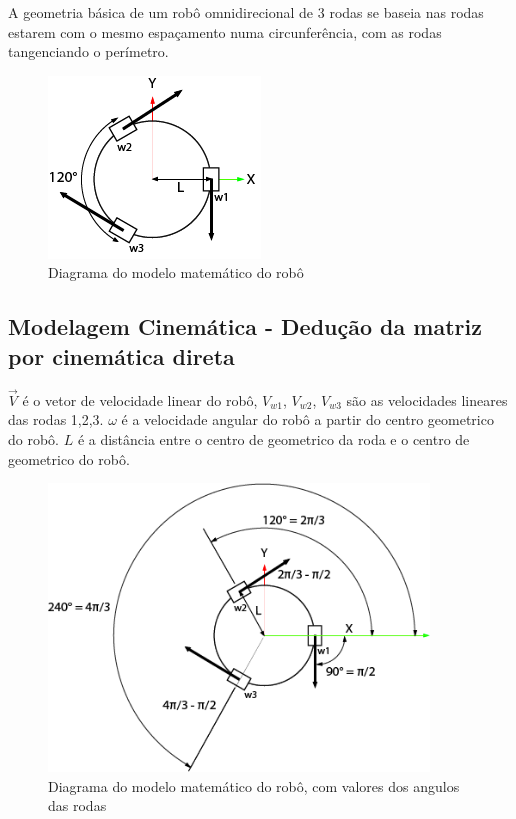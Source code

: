 
A geometria básica de um robô omnidirecional de 3 rodas se baseia nas rodas estarem com o mesmo espaçamento numa circunferência, com as rodas tangenciando o perímetro.

\begin{figure}[h]
	\centering
	\includegraphics{figures/model}
	\caption{Diagrama do modelo matemático do robô}
\end{figure}


\subsection{Modelagem Cinemática - Dedução da matriz por cinemática direta}

$\overrightarrow{V}$ é o vetor de velocidade linear do robô, $V_{w1}$, $V_{w2}$, $V_{w3}$ são as velocidades lineares das rodas 1,2,3. 
$\omega $ é a velocidade angular do robô a partir do centro geometrico do robô.
$L$ é a distância entre o centro de geometrico da roda e o centro de geometrico do robô.


\begin{figure}[h]
	\centering
	\includegraphics[width=0.9\textwidth]{figures/digram_model_dedution}
	\caption{Diagrama do modelo matemático do robô, com valores dos angulos das rodas}
\end{figure}

